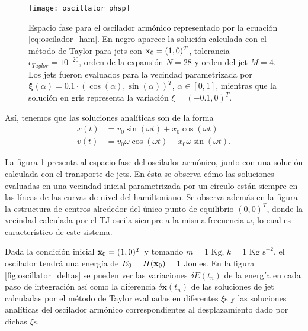 \begin{figure}[h!]
 \centering
 \texttt{[image: oscillator\_phsp]}
 \caption{Espacio fase para el oscilador armónico representado por la ecuación \ref{eq:oscilador_ham}. En negro aparece la solución calculada con el método de Taylor para jets con $\mathbf{x}_0 = (1,0)^T$, tolerancia $\epsilon_{Taylor} = 10^{-20}$, orden de la expansión $N = 28$ y orden del jet $M=4$. Los jets fueron evaluados para la vecindad parametrizada por $\mathbf{\xi}(\alpha) = 0.1\cdot \left( \cos(\alpha), \sin(\alpha) \right)^T$, $\alpha \in [0,1]$, mientras que la solución en gris representa la variación $\xi = (-0.1,0)^T$.}
 \label{fig:oscilador_phsp}
\end{figure}

Así, tenemos que las soluciones analíticas son de la forma 
\begin{align}
 x(t) &= v_{0}\sin{(\omega t)} + x_{0}\cos{(\omega t)} \nonumber \\ 
 v(t) &= v_{0}\omega\cos{(\omega t)} - x_{0}\omega\sin{(\omega t)}. 
 \label{eq:oscilador_analytical}
\end{align}

La figura \ref{fig:oscilador_phsp} presenta al espacio fase del oscilador armónico, junto con una solución calculada con el transporte de jets. En ésta se observa cómo las soluciones evaluadas en una vecindad inicial parametrizada por un círculo están siempre en las líneas de las curvas de nivel del hamiltoniano. Se observa además en la figura la estructura de centros alrededor del único punto de equilibrio $(0,0)^T$, donde la vecindad calculada por el TJ oscila siempre a la misma frecuencia $\omega$, lo cual es característico de este sistema.

Dada la condición inicial $\mathbf{x}_0 = (1,0)^T$ y tomando $m = 1 \textrm{ Kg}$, $k = 1 \textrm{ Kg s}^{-2}$, el oscilador tendrá una energía de $E_0 = H(\mathbf{x}_0) = 1$ Joules. En la figura \ref{fig:oscillator_deltas} se pueden ver las variaciones $\delta E(t_n)$ de la energía en cada paso de integración así como la diferencia $\delta \mathbf{x}(t_n)$ de las soluciones de jet calculadas por el método de Taylor evaluadas en diferentes $\xi$s y las soluciones analíticas del oscilador armónico correspondientes al desplazamiento dado por dichas $\xi$s.

